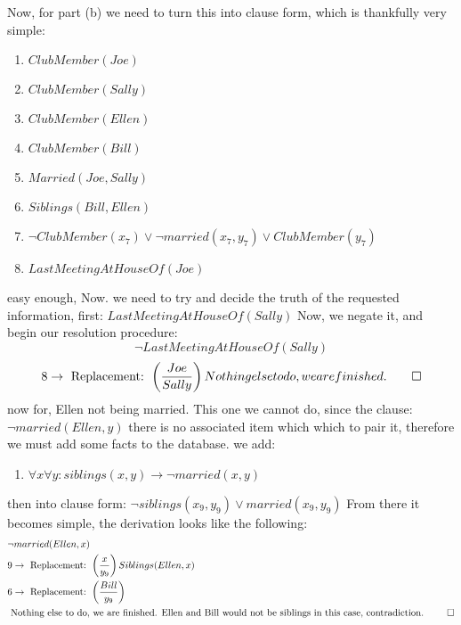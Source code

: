 \documentclass[11pt]{article}
\begin{document}
\begin{enumerate}
\begin{enumerate}[(1)]
\end{enumerate}
 Now, for part (b) we need to turn this into clause form, which is thankfully very simple: \\
\begin{enumerate}[(1)]
\item $ClubMember(Joe)$
\item $ClubMember(Sally)$
\item $ClubMember(Ellen)$
\item $ClubMember(Bill)$
\item $Married(Joe, Sally)$
\item $Siblings(Bill, Ellen)$
\item $\neg  ClubMember(x_7) \vee \neg married(x_7, y_7) \vee ClubMember(y_7)$
\item $LastMeetingAtHouseOf(Joe)$ 
\end{enumerate}
easy enough, Now. we need to try and decide the truth of the requested information, first: 
$LastMeetingAtHouseOf(Sally)$
Now, we negate it, and begin our resolution procedure: 
$$ \neg LastMeetingAtHouseOf(Sally)$$
\begin{align*}
&8 \rightarrow \text{ Replacement: } \left ( \frac{Joe}{Sally} \right ) Nothing else to do, we are finished. \qed\\
\end{align*}
now for, Ellen not being married. This one we cannot do, since the clause: $\neg married(Ellen, y)$ there is no associated item which which to pair it, therefore we must add some facts to the database. 
we add: 
\begin{enumerate}[(9)]
\item $\forall x \forall y : siblings(x, y) \rightarrow \neg married(x, y)$
\end{enumerate}
then into clause form: $\neg siblings(x_9, y_9) \vee married(x_9, y_9)$
From there it becomes simple, the derivation looks like the following: 
\begin{align*}
&\neg married(Ellen, x)\\
& 9 \rightarrow \text{ Replacement: } \left ( \frac{x}{y_9} \right ) Siblings(Ellen, x)\\
&6 \rightarrow \text{ Replacement: } \left ( \frac{Bill}{y_9} \right )\\
& \text{ Nothing else to do, we are finished. Ellen and Bill would not be siblings in this case, contradiction. } \qed\\
\end{align*}

\end{enumerate}
\end{document}
